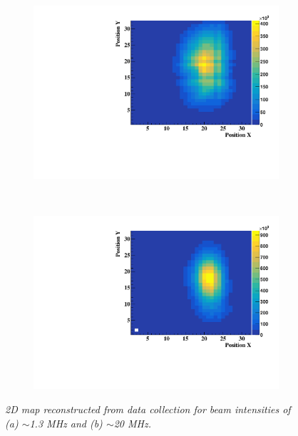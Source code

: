 \documentclass[a4paper,11pt]{article}
\begin{document}
\begin{figure}[htb]
\centering
    \begin{subfigure}{0.45\textwidth} \centering \includegraphics[width=\textwidth]{figures/2D_Map_1MHz.pdf} \caption{} \label{fig:2D_1MHz}
    \end{subfigure}
    ~
    \begin{subfigure}{0.45\textwidth} \centering \includegraphics[width=\textwidth]{figures/2D_Map_20MHz.pdf} \caption{} \label{fig:2D_20MHz}
    \end{subfigure}
\caption{\small{\textit{2D map reconstructed from data collection for beam intensities of (a) $\sim$1.3 MHz and (b) $\sim$20 MHz.}}}
\label{fig:2D_Maps}
\end{figure}
\end{document}
